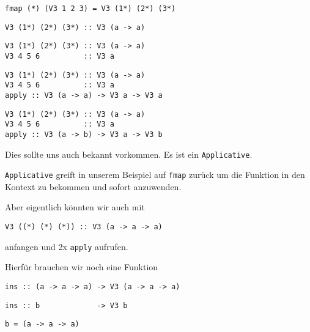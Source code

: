\documentclass{beamer}
\begin{document}
\begin{frame}[fragile]
\begin{overprint}
\begin{verbatim}
fmap (*) (V3 1 2 3) = V3 (1*) (2*) (3*)
\end{verbatim}
\begin{verbatim}
V3 (1*) (2*) (3*) :: V3 (a -> a)
\end{verbatim}
\begin{verbatim}
V3 (1*) (2*) (3*) :: V3 (a -> a)
V3 4 5 6          :: V3 a
\end{verbatim}
\begin{verbatim}
V3 (1*) (2*) (3*) :: V3 (a -> a)
V3 4 5 6          :: V3 a
apply :: V3 (a -> a) -> V3 a -> V3 a
\end{verbatim}
\begin{verbatim}
V3 (1*) (2*) (3*) :: V3 (a -> a)
V3 4 5 6          :: V3 a
apply :: V3 (a -> b) -> V3 a -> V3 b
\end{verbatim}
\end{overprint}
\pause
\pause
\pause
\pause
\pause
\bigskip

Dies sollte uns auch bekannt vorkommen. \pause
Es ist ein \texttt{Applicative}.\pause
\bigskip

\texttt{Applicative} greift in unserem Beispiel auf \texttt{fmap} zurück um die Funktion in den Kontext zu bekommen und sofort anzuwenden.\pause

Aber eigentlich könnten wir auch mit
\begin{verbatim}
V3 ((*) (*) (*)) :: V3 (a -> a -> a)
\end{verbatim}
anfangen und 2x \texttt{apply} aufrufen.\\\par
\pause
Hierfür brauchen wir noch eine Funktion
\begin{overprint}
\begin{verbatim}
ins :: (a -> a -> a) -> V3 (a -> a -> a)
\end{verbatim}
\begin{verbatim}
ins :: b             -> V3 b
\end{verbatim}
\texttt{b = (a -> a -> a)}
\end{overprint}
\end{frame}
\end{document}
